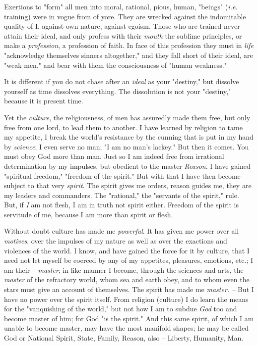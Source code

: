 \documentclass[a4paper]{book}
\begin{document}
Exertions to "{}form"{} all men into moral, rational, pious, human, 
"{}beings"{} (\textit{i.e.} training) were in vogue from of yore. They are 
wrecked against the indomitable quality of I, against own nature, against 
egoism. Those who are trained never attain their ideal, and only profess with 
their \textit{mouth} the sublime principles, or make a \textit{profession}, a 
profession of faith. In face of this profession they must in \textit{life} 
"{}acknowledge themselves sinners altogether,"{} and they fall short of their 
ideal, are "{}weak men,"{} and bear with them the consciousness of "{}human 
weakness."{}

It is different if you do not chase after an \textit{ideal} as your 
"{}destiny,"{} but dissolve yourself as time dissolves everything. The 
dissolution is not your "{}destiny,"{} because it is present time.

Yet the \textit{culture}, the religiousness, of men has assuredly made them 
free, but only free from one lord, to lead them to another. I have learned by 
religion to tame my appetite, I break the world's resistance by the cunning 
that is put in my hand by \textit{science}; I even serve no man; "{}I am no 
man's lackey."{} But then it comes. You must obey God more than man. Just so I 
am indeed free from irrational determination by my impulses. but obedient to 
the master \textit{Reason}. I have gained "{}spiritual freedom,"{} "{}freedom 
of the spirit."{} But with that I have then become subject to that very 
\textit{spirit}. The spirit gives me orders, reason guides me, they are my 
leaders and commanders. The "{}rational,"{} the "{}servants of the spirit,"{} 
rule. But, if \textit{I} am not flesh, I am in truth not spirit either. 
Freedom of the spirit is servitude of me, because I am more than spirit or 
flesh.

Without doubt culture has made me \textit{powerful}. It has given me power 
over all \textit{motives}, over the impulses of my nature as well as over the 
exactions and violences of the world. I know, and have gained the force for it 
by culture, that I need not let myself be coerced by any of my appetites, 
pleasures, emotions, etc.; I am their -- \textit{master}; in like manner I 
become, through the sciences and arts, the \textit{master} of the refractory 
world, whom sea and earth obey, and to whom even the stars must give an 
account of themselves. The spirit has made me \textit{master. --} But I have 
no power over the spirit itself. From religion (culture) I do learn the means 
for the "{}vanquishing of the world,"{} but not how I am to subdue 
\textit{God} too and become master of him; for God "{}is the spirit."{} And 
this same spirit, of which I am unable to become master, may have the most 
manifold shapes; he may be called God or National Spirit, State, Family, 
Reason, also -- Liberty, Humanity, Man.
\end{document}
